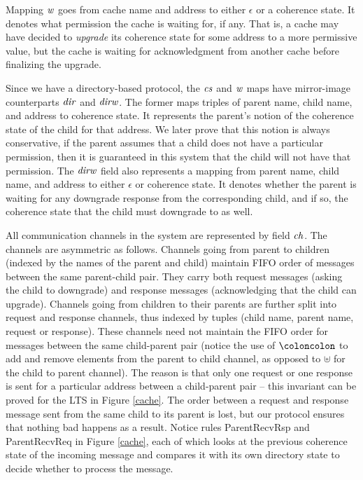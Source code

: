 Mapping $\mathit{w}$ goes from cache name and address to either $\epsilon$ or a
coherence state.  It denotes what permission the cache is waiting for,
if any.  That is, a cache may have decided to \emph{upgrade} its
coherence state for some address to a more permissive value, but the
cache is waiting for acknowledgment from another cache before
finalizing the upgrade.

Since we have a directory-based protocol, the $\mathit{cs}$ and
$\mathit{w}$ maps have mirror-image counterparts $\mathit{dir}$ and $\mathit{dirw}$.
The former maps triples of parent name, child name, and address to
coherence state. It represents the parent's notion of the
coherence state of the child for that address. We later prove that this notion
is always conservative, \ie{} if the parent assumes that a child does not have
a particular permission, then it is guaranteed in this system that the child
will not have that permission.  The $\mathit{dirw}$ field also represents a mapping from parent
name, child name, and address to either $\epsilon$ or coherence state. It
denotes whether the parent is waiting for any downgrade response from the
corresponding child, and if so, the coherence state that the child must
downgrade to as well.

All communication channels in the system are represented by field $\mathit{ch}$.
The channels are asymmetric as
follows. Channels going from parent to children (indexed by the names of the
parent and child) maintain FIFO order of messages between the same parent-child
pair. They carry both request messages (asking the child to downgrade) and
response messages (acknowledging that the child can upgrade). Channels going
from children to their parents are further split into request and response
channels, thus indexed by tuples (child name, parent name, request or response).
These channels need not maintain the FIFO order for messages between the same
child-parent pair (notice the use of $\coloncolon$ to add and remove elements
from the parent to child channel, as opposed to $\uplus$ for the 
child to parent channel). The reason is that only one request or one response is
sent for a particular address between a child-parent pair -- this invariant can
be proved for the LTS in  Figure \ref{cache}. The order between a request and
response message sent from the same child to its parent is lost, but our
protocol ensures that nothing bad happens as a result.  Notice rules
ParentRecvRsp and ParentRecvReq in Figure \ref{cache}, each of which looks at the
previous coherence state of the incoming message and compares it with its own
directory state to decide whether to process the message.

